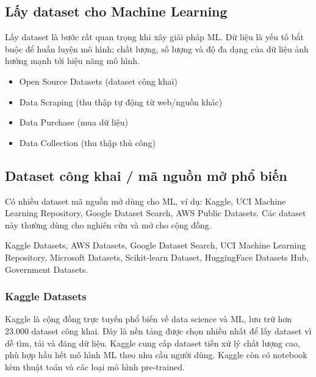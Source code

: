 \subsection{Lấy dataset cho Machine Learning}

\begin{ynghia}[title={Tầm quan trọng của bước lấy dữ liệu}]
Lấy dataset là bước rất quan trọng khi xây giải pháp ML.
Dữ liệu là yếu tố bắt buộc để huấn luyện mô hình; chất lượng, số lượng và độ đa dạng của dữ liệu ảnh hưởng mạnh tới hiệu năng mô hình.
\end{ynghia}

\begin{phuongphap}[title={Bốn nguồn chính}]
\begin{itemize}
  \item Open Source Datasets (dataset công khai)
  \item Data Scraping (thu thập tự động từ web/nguồn khác)
  \item Data Purchase (mua dữ liệu)
  \item Data Collection (thu thập thủ công)
\end{itemize}
\end{phuongphap}

\subsection{Dataset công khai / mã nguồn mở phổ biến}

\begin{ynghia}[title={Kho dữ liệu công khai}]
Có nhiều dataset mã nguồn mở dùng cho ML, ví dụ: Kaggle, UCI Machine Learning Repository, Google Dataset Search, AWS Public Datasets.
Các dataset này thường dùng cho nghiên cứu và mở cho cộng đồng.
\end{ynghia}

\begin{phuongphap}[title={Một số nguồn có dữ liệu có cấu trúc, giá trị cao}]
Kaggle Datasets, AWS Datasets, Google Dataset Search, UCI Machine Learning Repository, Microsoft Datasets, Scikit-learn Dataset, HuggingFace Datasets Hub, Government Datasets.
\end{phuongphap}

\subsubsection{Kaggle Datasets}

\begin{ynghia}[title={Kaggle Datasets}]
Kaggle là cộng đồng trực tuyến phổ biến về data science và ML, lưu trữ hơn 23.000 dataset công khai.
Đây là nền tảng được chọn nhiều nhất để lấy dataset vì dễ tìm, tải và đăng dữ liệu.
Kaggle cung cấp dataset tiền xử lý chất lượng cao, phù hợp hầu hết mô hình ML theo nhu cầu người dùng.
Kaggle còn có notebook kèm thuật toán và các loại mô hình pre-trained.
\end{ynghia}

